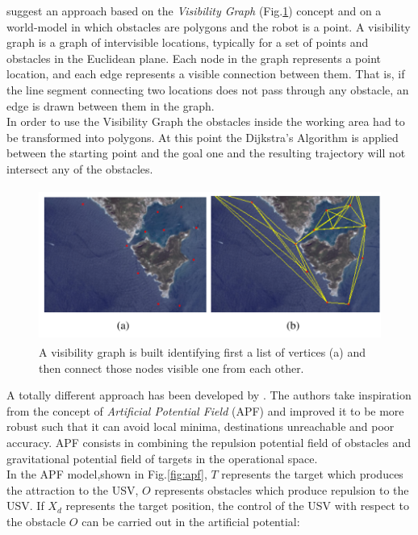 \documentclass[12pt]{article}
\begin{document}
              \indent \textcite{Casalino2009} suggest an approach based on the \textit{Visibility Graph} (Fig.\ref{fig:visibility}) concept and on a world-model in which obstacles are polygons and the robot is a point. A visibility graph is a graph of intervisible locations, typically for a set of points and obstacles in the Euclidean plane. Each node in the graph represents a point location, and each edge represents a visible connection between them. That is, if the line segment connecting two locations does not pass through any obstacle, an edge is drawn between them in the graph.\\
              In order to use the Visibility Graph the obstacles inside the working area had to be transformed into polygons. At this point the Dijkstra's Algorithm \parencite{EWD:NumerMath59} is applied between the starting point and the goal one and the resulting trajectory will not intersect any of the obstacles.


              \begin{figure}
                    \centering
                    \includegraphics[height=5cm]{./Images/Casalino/visibility_graph}
                    \caption{A visibility graph is built identifying first a list of vertices (a) and then connect those nodes visible one from each other.}
                    \label{fig:visibility}
              \end{figure}

              A totally different approach has been developed by \textcite{Xie2014}. The authors take inspiration from the concept of \textit{Artificial Potential Field} (APF) \parencite{Khatib1985} and improved it to be more robust such that it can avoid local minima, destinations unreachable and poor accuracy. APF consists in combining the repulsion potential field of obstacles and gravitational potential field of targets in the operational space.\\
              In the APF model,shown in Fig.\ref{fig:apf}, $T$ represents the target which produces the attraction to the USV, $O$ represents obstacles which produce repulsion to the USV. If $X_d$ represents the target position, the control of the USV with respect to the obstacle $O$ can be carried out in the artificial potential:
\end{document}
